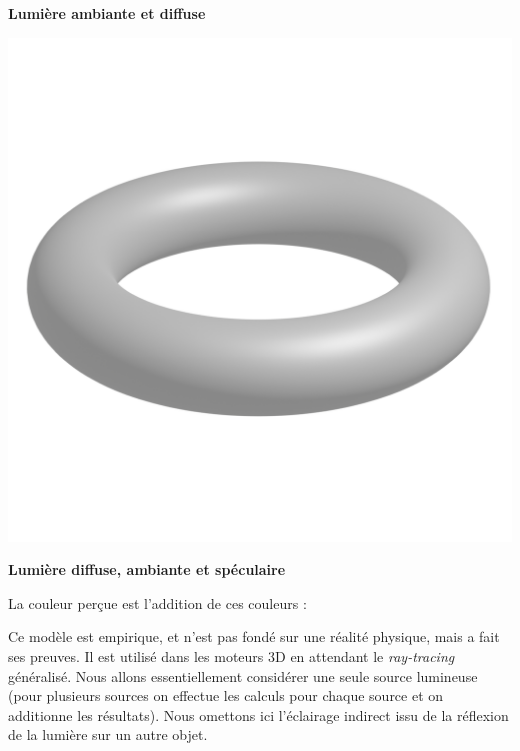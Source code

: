 \documentclass[11pt,class=report,crop=false]{standalone}
\begin{document}
\begin{center}
\begin{minipage}{0.49\textwidth}
	{\bf \qquad Lumière ambiante et diffuse}
    \end{minipage}
    \begin{minipage}{0.49\textwidth}
	\center
	\includegraphics[scale=\myscale,scale=0.20, trim={0 6cm 0 4cm}, clip]{figures/tore-ambiante-diffuse-speculaire}
	
	{\bf \qquad Lumière diffuse, ambiante et spéculaire}
    \end{minipage}
	
\end{center}

La couleur perçue est l'addition de ces couleurs :


Ce modèle est empirique, et n'est pas fondé sur une réalité physique, mais a fait ses preuves. Il est utilisé dans les moteurs 3D en attendant le \emph{ray-tracing} généralisé.
Nous allons essentiellement considérer une seule source lumineuse (pour plusieurs sources on effectue les calculs pour chaque source et on additionne les résultats). 
Nous omettons ici l'éclairage indirect issu de la réflexion de la lumière sur un autre objet.

\end{document}
